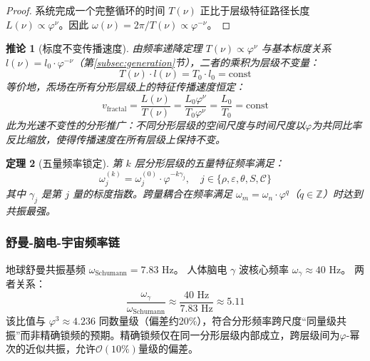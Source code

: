 \documentclass[12pt,a4paper,twocolumn]{article}
\renewcommand{\phi}{\varphi}
\newtheorem{theorem}{定理}[section]
\newtheorem{corollary}[theorem]{推论}
\begin{document}
\begin{proof}
系统完成一个完整循环的时间 $T(\nu)$ 正比于层级特征路径长度 $L(\nu) \propto \phi^\nu$。因此 $\omega(\nu) = 2\pi/T(\nu) \propto \phi^{-\nu}$。
\end{proof}

\begin{corollary}[标度不变传播速度]
\label{cor:scale_invariant_velocity}
由频率递降定理 $T(\nu) \propto \phi^{\nu}$ 与基本标度关系 $l(\nu) = l_0 \cdot \phi^{-\nu}$（第\ref{subsec:generation}节），二者的乘积为层级不变量：
\begin{equation}
T(\nu) \cdot l(\nu) = T_0 \cdot l_0 = \text{const}
\end{equation}
等价地，炁场在所有分形层级上的特征传播速度恒定：
\begin{equation}
v_{\text{fractal}} = \frac{L(\nu)}{T(\nu)} = \frac{L_0 \phi^{\nu}}{T_0 \phi^{\nu}} = \frac{L_0}{T_0} = \text{const}
\end{equation}
此为光速不变性的分形推广：不同分形层级的空间尺度与时间尺度以$\phi$为共同比率反比缩放，使得传播速度在所有层级上保持不变。
\end{corollary}

\begin{theorem}[五量频率锁定]
第 $k$ 层分形层级的五量特征频率满足：
\begin{equation}
\omega_j^{(k)} = \omega_j^{(0)} \cdot \phi^{-k\gamma_j}, \quad j \in \{\rho, \varepsilon, \theta, S, \mathcal{C}\}
\end{equation}
其中 $\gamma_j$ 是第 $j$ 量的标度指数。跨量耦合在频率满足 $\omega_m = \omega_n \cdot \phi^q$（$q \in \mathbb{Z}$）时达到共振最强。
\end{theorem}

\subsubsection{舒曼-脑电-宇宙频率链}

地球舒曼共振基频 $\omega_{\text{Schumann}} = 7.83$ Hz。
人体脑电 $\gamma$ 波核心频率 $\omega_\gamma \approx 40$ Hz。
两者关系：
\begin{equation}
\frac{\omega_\gamma}{\omega_{\text{Schumann}}} \approx \frac{40\text{ Hz}}{7.83\text{ Hz}} \approx 5.11
\end{equation}
该比值与 $\phi^3 \approx 4.236$ 同数量级（偏差约20\%），符合分形频率跨尺度``同量级共振''而非精确锁频的预期。精确锁频仅在同一分形层级内部成立，跨层级间为$\phi$-幂次的近似共振，允许$\mathcal{O}(10\%)$量级的偏差。
\end{document}
